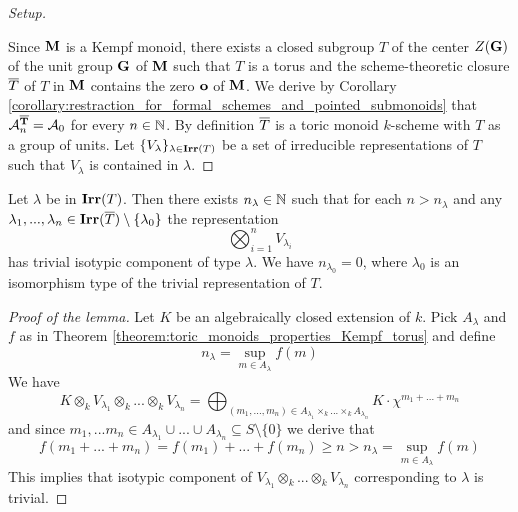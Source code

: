 \begin{proof}[Setup]
\begin{enumerate}[label=\textbf{(\arabic*)}, leftmargin=3.0em]
\end{enumerate}
 Since $\mathbf{M}$ is a Kempf monoid, there exists a closed subgroup $T$ of the center $Z(\mathbf{G})$ of the unit group $\mathbf{G}$ of $\mathbf{M}$ such that $T$ is a torus and the scheme-theoretic closure $\overline{T}$ of $T$ in $\mathbf{M}$ contains the zero $\mathbf{o}$ of $\mathbf{M}$. We derive by Corollary \ref{corollary:restraction_for_formal_schemes_and_pointed_submonoids} that ${\mathcal A}_n^{\mathbf{\overline{T}}} = {\mathcal A}_0$ for every $n\in {\mathbb N}$. By definition $\overline{T}$ is a toric monoid $k$-scheme with $T$ as a group of units. Let $\{V_{\lambda}\}_{\lambda\in \mathbf{Irr}(T)}$ be a set of irreducible representations of $T$ such that $V_{\lambda}$ is contained in $\lambda$.
\end{proof}

\begin{lemma}\label{lemma:stablization_for_representations}
Let $\lambda$ be in $\mathbf{Irr}(T)$. Then there exists $n_{\lambda}\in {\mathbb N}$ such that for each $n > n_{\lambda}$ and any $\lambda_1,...,\lambda_n\in \mathbf{Irr}(\overline{T})\setminus \{\lambda_0\}$ the representation
$$\bigotimes_{i=1}^nV_{\lambda_i}$$ 
has trivial isotypic component of type $\lambda$. We have $n_{\lambda_0} = 0$, where $\lambda_0$ is an isomorphism type of the trivial representation of $T$.
\end{lemma}
\begin{proof}[Proof of the lemma]
Let $K$ be an algebraically closed extension of $k$. Pick $A_{\lambda}$ and $f$ as in Theorem \ref{theorem:toric_monoids_properties_Kempf_torus} and define
$$n_{\lambda} = \sup_{m\in A_{\lambda}}f(m)$$
We have
$$K\otimes_kV_{\lambda_1}\otimes_k...\otimes_kV_{\lambda_n} = \bigoplus_{(m_1,...,m_n)\in A_{\lambda_1}\times_k ...\times_k A_{\lambda_n}}K\cdot \chi^{m_1+...+m_n}$$
and since $m_1,...m_n\in A_{\lambda_1}\cup ...\cup A_{\lambda_n}\subseteq S\setminus \{0\}$ we derive that
$$f(m_1+...+m_n) = f(m_1) + ... + f(m_n) \geq n > n_{\lambda} = \sup_{m\in A_{\lambda}}f(m)$$
This implies that isotypic component of $V_{\lambda_1}\otimes_k...\otimes_kV_{\lambda_n}$ corresponding to $\lambda$ is trivial.
\end{proof}

